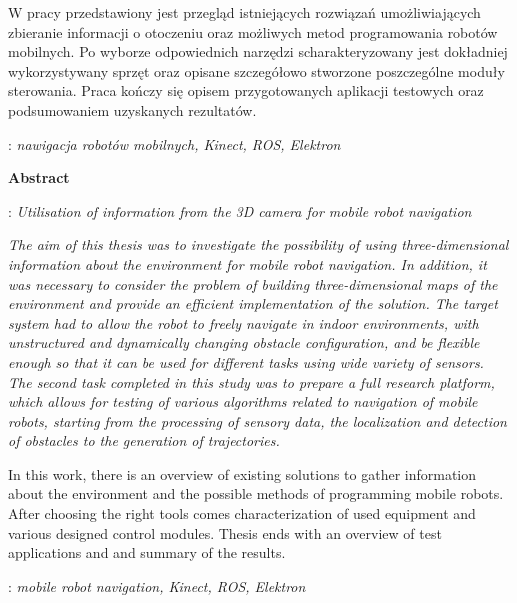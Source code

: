 \begin{titlepage}
{    W pracy przedstawiony jest przegląd istniejących rozwiązań umożliwiających
    zbieranie informacji o otoczeniu oraz możliwych metod programowania
    robotów mobilnych. Po wyborze odpowiednich narzędzi scharakteryzowany jest
    dokładniej wykorzystywany sprzęt oraz opisane szczegółowo stworzone poszczególne
    moduły sterowania. Praca kończy się opisem przygotowanych aplikacji testowych
    oraz podsumowaniem uzyskanych rezultatów.
    }
    \vspace*{1\baselineskip}

    : {\itshape nawigacja robotów mobilnych, Kinect, ROS, Elektron }
    \par
    \vspace{4\baselineskip}
    \begin{center}
	{\large\bfseries Abstract}\par\bigskip
    \end{center}
    : {\itshape Utilisation of information from the 3D camera for mobile robot navigation}\par
    \vspace*{1\baselineskip}
    {\itshape
    The aim of this thesis was to investigate the possibility of using three-dimensional
    information about the environment for mobile robot navigation. In addition,
    it was necessary to consider the problem of building three-dimensional maps
    of the environment and provide an efficient implementation of the solution.
    The target system had to allow the robot to freely navigate in indoor environments,
    with unstructured and dynamically changing obstacle configuration, and be flexible enough
    so that it can be used for different tasks using wide variety of sensors.
    The second task completed in this study was to prepare a full research platform,
    which allows for testing of various algorithms related to navigation
    of mobile robots, starting from the processing of sensory data, the localization and
    detection of obstacles to the generation of trajectories.

    In this work, there is an overview of existing solutions to gather information about the environment
    and the possible methods of programming mobile robots. After choosing the right
    tools comes characterization of used equipment and various designed control modules.
    Thesis ends with an overview of test applications and and summary of the results.
    }
    \vspace*{1\baselineskip}

    : {\itshape mobile robot navigation, Kinect, ROS, Elektron}

\end{titlepage}
